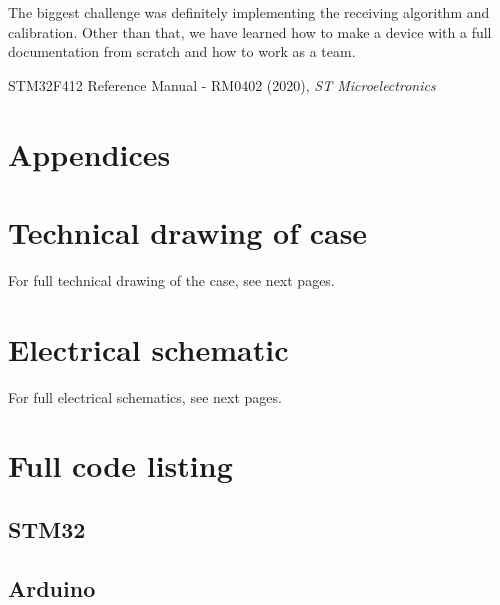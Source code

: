 \documentclass[12pt]{article}
\begin{document}
  The biggest challenge was definitely implementing the receiving algorithm and calibration. Other than that, we have learned how to make a device 
  with a full documentation from scratch and how to work as a team.
	
	\begin{thebibliography}{9}
     STM32F412 Reference Manual - RM0402 (2020), \emph{ST Microelectronics}
	\end{thebibliography}
	

  \section*{Appendices}
	\appendix
	\section{Technical drawing of case}
  For full technical drawing of the case, see next pages.
	\section{Electrical schematic}
  For full electrical schematics, see next pages.
  
	\section{Full code listing}
  \subsection{STM32}
  \label{appendix:code}
  
  \newpage
  \subsection{Arduino}
  
	
\end{document}
